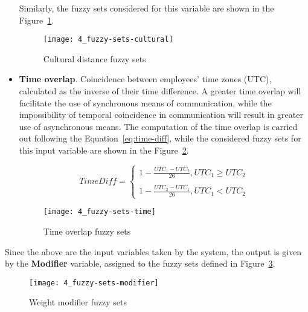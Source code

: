 \begin{itemize}
	Similarly, the fuzzy sets considered for this variable are shown in the Figure~\ref{fig:fs-cultural}.\newline

	\begin{figure}
		\centering
		\texttt{[image: 4\_fuzzy-sets-cultural]}
		\caption[Cultural distance fuzzy sets]{Cultural distance fuzzy sets}
		\label{fig:fs-cultural}
	\end{figure}
	
\item \textbf{Time overlap}. Coincidence between employees’ time zones (UTC), calculated as the inverse of their time difference. A greater time overlap will facilitate the use of synchronous means of communication, while the impossibility of temporal coincidence in communication will result in greater use of asynchronous means. The computation of the time overlap is carried out following the Equation~\ref{eq:time-diff}, while the considered fuzzy sets for this input variable are shown in the Figure~\ref{fig:fs-time}.\newline

	\begin{equation}
		\label{eq:time-diff}
		TimeDiff = \left\{\begin{matrix}
		1 - \frac{UTC_1-UTC_2}{26}, UTC_1 \geq UTC_2
		\\
		\\
		1 - \frac{UTC_2-UTC_1}{26}, UTC_1 < UTC_2
		\end{matrix}\right.
	\end{equation}

	\begin{figure}
		\centering
		\texttt{[image: 4\_fuzzy-sets-time]}
		\caption[Time overlap fuzzy sets]{Time overlap fuzzy sets}
		\label{fig:fs-time}
	\end{figure}

\end{itemize}

Since the above are the input variables taken by the system, the output is given by the \textbf{Modifier} variable, assigned to the fuzzy sets defined in Figure~\ref{fig:fs-modifier}.
	
\begin{figure}
	\centering
	\texttt{[image: 4\_fuzzy-sets-modifier]}
	\caption[Weight modifier fuzzy sets]{Weight modifier fuzzy sets}
	\label{fig:fs-modifier}
\end{figure}
	
